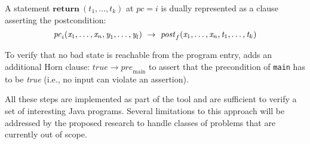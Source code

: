 A statement $\textbf{return} \ (t_1, \ldots, t_k)$ at
$\mathit{pc}=i$ is dually represented as a clause asserting the
postcondition:
\begin{equation*}
\mathit{pc}_i(\textit{x}_1, \ldots, \textit{x}_n, \textit{y}_1, \ldots, \textit{y}_l)
~\to~ \mathit{post}_f(\textit{x}_1, \ldots, \textit{x}_n,\textit{t}_1,\ldots,\textit{t}_{k}) 
\end{equation*}

To verify that no bad state is reachable from the program
entry, \jayhorn adds an additional Horn clause: $true \to
\mathit{pre}_{\text{main}}$ to assert that the precondition of
\texttt{main} has to be \textit{true} (i.e., no input can violate an
assertion).
%

All these steps are implemented as part of the \jayhorn tool and are
sufficient to verify a set of interesting Java programs. Several limitations to this approach will be addressed by
the proposed research to handle classes of problems that are currently
out of scope.

